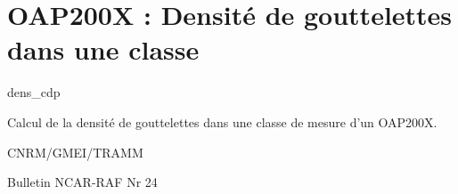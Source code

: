 %
\section{OAP200X : Densit\'e de gouttelettes dans une classe}

 {\sf dens\_cdp}

Calcul de la densit\'e de gouttelettes dans une classe de
mesure d'un OAP200X.

\bigskip





CNRM/GMEI/TRAMM

Bulletin NCAR-RAF Nr 24 \cite{RAF-24}

